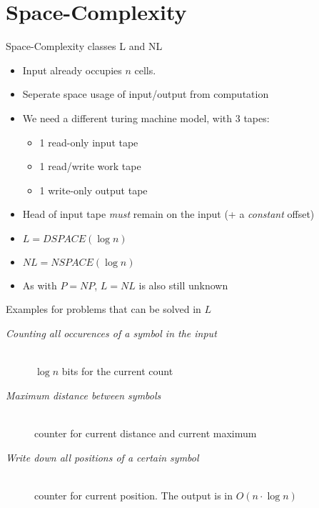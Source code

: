 \section{Space-Complexity}\label{space-complexity}

\begin{frame}{Space-Complexity classes L and NL}

\begin{itemize}
\item
  Input already occupies $n$ cells.
\item
  Seperate space usage of input/output from computation
\item
  We need a different turing machine model, with 3 tapes:

  \begin{itemize}
  \itemsep1pt\parskip0pt
  \item
    1 read-only input tape
  \item
    1 read/write work tape
  \item
    1 write-only output tape
  \end{itemize}
\item
  Head of input tape \emph{must} remain on the input (+ a
  \emph{constant} offset)
\item
  $L = DSPACE(\log n)$
\item
  $NL = NSPACE(\log n)$
\item
  As with $P = NP$, $L = NL$ is also still unknown
\end{itemize}

\end{frame}

\begin{frame}{Examples for problems that can be solved in $L$}

\begin{description}
  \item[\textit{Counting all occurences of a symbol in the input}] \hfill \\
    $\log n$ bits for the current count
  \item[\textit{Maximum distance between symbols}] \hfill \\
    counter for current distance and current maximum
  \item[\textit{Write down all positions of a certain symbol}] \hfill \\
    counter for current position. The output is in $O(n \cdot \log n)$
\end{description}

\end{frame}

